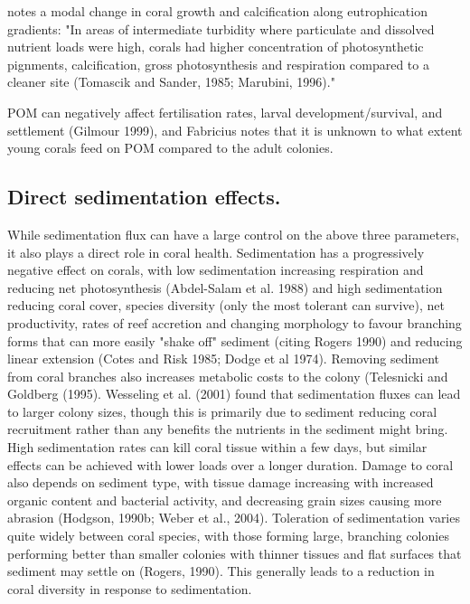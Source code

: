 \documentclass[11pt,a4paper]{article}
\begin{document}
\cite{Fabricius2005} notes a modal change in coral growth and calcification along eutrophication gradients: "In areas of intermediate turbidity where particulate and dissolved nutrient loads were high, corals had higher concentration of photosynthetic pignments, calcification, gross photosynthesis and respiration compared to a cleaner site (Tomascik and Sander, 1985; Marubini, 1996)." 

POM can negatively affect fertilisation rates, larval development/survival, and settlement (Gilmour 1999), and Fabricius notes that it is unknown to what extent young corals feed on POM compared to the adult colonies.


\subsection{Direct sedimentation effects.}

While sedimentation flux can have a large control on the above three parameters, it also plays a direct role in coral health.
Sedimentation has a progressively negative effect on corals, with low sedimentation increasing respiration and reducing net photosynthesis (Abdel-Salam et al. 1988) and high sedimentation reducing coral cover, species diversity (only the most tolerant can survive), net productivity, rates of reef accretion and changing morphology to favour branching forms that can more easily "shake off" sediment (citing Rogers 1990) and reducing linear extension (Cotes and Risk 1985; Dodge et al 1974).
 Removing sediment from coral branches also increases metabolic costs to the colony (Telesnicki and Goldberg (1995).
Wesseling et al. (2001) found that sedimentation fluxes can lead to larger colony sizes, though this is primarily due to sediment reducing coral recruitment rather than any benefits the nutrients in the sediment might bring.  
High sedimentation rates can kill coral tissue within a few days, but similar effects can be achieved with lower loads over a longer duration. Damage to coral also depends on sediment type, with tissue damage increasing with increased organic content and bacterial activity, and decreasing grain sizes causing more abrasion (Hodgson, 1990b; Weber et al., 2004). 
Toleration of sedimentation varies quite widely between coral species, with those forming large, branching colonies performing better than smaller colonies with thinner tissues and flat surfaces that sediment may settle on (Rogers, 1990). This generally leads to a reduction in coral diversity in response to sedimentation.
\end{document}
